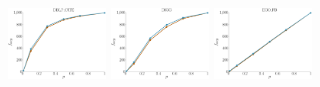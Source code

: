 \documentclass[a4paper]{report}
\newcommand{\wratio}{0.195}
\begin{document}
\includegraphics[width=\wratio\textwidth]{influence/DBLP_CITE/fs_dblp_cite}\hfill
\includegraphics[width=\wratio\textwidth]{influence/DIGG/fs_digg}\hfill
\vfill
\includegraphics[width=\wratio\textwidth]{influence/EGO_FB/fs_ego_fb}\hfill
\end{document}
